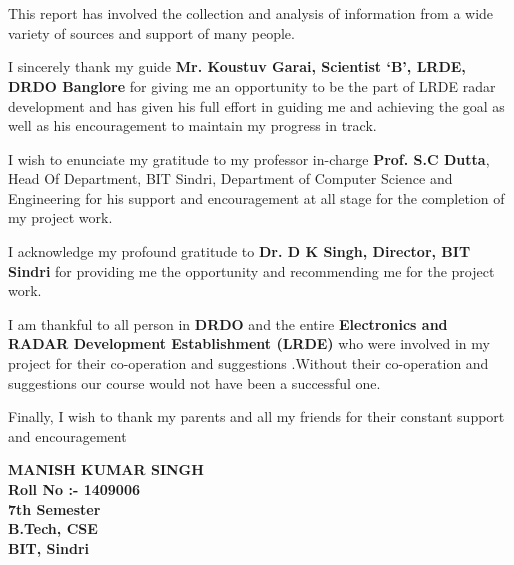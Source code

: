 \documentclass[12pt]{article} %
\begin{document}
\newpage
\thispagestyle{plain}
\section*{\LARGE\bfseries{\\ }}
This report has involved the collection and analysis of information from a wide variety of sources and support of many people.
\\
 \par         I sincerely thank my guide \textbf{Mr. Koustuv Garai, Scientist `B', LRDE, DRDO Banglore} for giving me an opportunity to be the part of LRDE radar development and has given his full effort in guiding me and achieving the goal as well as his encouragement to maintain my progress in track.
 \\
  \par       I wish to enunciate my gratitude to my professor in-charge \textbf{Prof. S.C Dutta}, Head Of Department, BIT Sindri, Department of Computer Science and Engineering for his support and encouragement at all stage for the completion of my project work.
  \\
 \par       I acknowledge my profound gratitude to\textbf{ Dr. D K Singh, Director, BIT Sindri} for providing me the opportunity and recommending me for the project work.\\
 \par        I am thankful to all person in \textbf{DRDO} and the entire \textbf{Electronics and RADAR Development Establishment (LRDE)} who were involved in my project for their co-operation and suggestions .Without their co-operation and suggestions our course would not have been a successful one.\\

 \par        Finally, I wish to thank my parents and all my friends for their constant support and encouragement
 \vspace{2cm}
  \begin{flushright}
 \begin{minipage}[t]{7cm}

\centering
\textbf{ MANISH KUMAR SINGH \\
 Roll No :- 1409006 \\
7th Semester \\
 B.Tech, CSE\\
BIT, Sindri}

 \end{minipage}
 
 \end{flushright}
\end{document}

